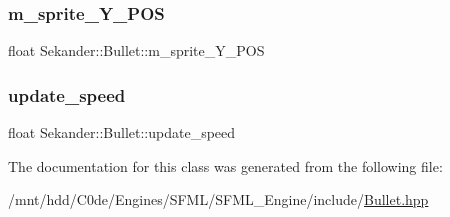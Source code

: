\subsubsection{\texorpdfstring{m\+\_\+sprite\+\_\+\+Y\+\_\+\+P\+OS}{m\_sprite\_Y\_POS}}
{\footnotesize\ttfamily float Sekander\+::\+Bullet\+::m\+\_\+sprite\+\_\+\+Y\+\_\+\+P\+OS\hspace{0.3cm}{\ttfamily [private]}}

\mbox{\label{classSekander_1_1Bullet_a3ffffd748d6b7c0e7afd88a1c2603642}} 
\subsubsection{\texorpdfstring{update\+\_\+speed}{update\_speed}}
{\footnotesize\ttfamily float Sekander\+::\+Bullet\+::update\+\_\+speed\hspace{0.3cm}{\ttfamily [private]}}



The documentation for this class was generated from the following file\+:\begin{DoxyCompactItemize}
\item 
/mnt/hdd/\+C0de/\+Engines/\+S\+F\+M\+L/\+S\+F\+M\+L\+\_\+\+Engine/include/\hyperlink{Bullet_8hpp}{Bullet.\+hpp}\end{DoxyCompactItemize}

